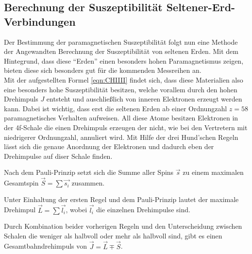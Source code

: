 \subsection{Berechnung der Suszeptibilität Seltener-Erd-Verbindungen}
\label{sadge2}
Der Bestimmung der paramagnetischen Suszeptibilität folgt nun eine Methode der Angewandten Berechnung der Suszeptibilität von 
seltenen Erden. Mit dem Hintegrund, dass diese \enquote{Erden} einen besonders hohen Paramagnetismus zeigen, bieten diese sich besonders
gut für die kommenden Messreihen an. 
\\
\newline
Mit der aufgestellten Formel \eqref{eqn:CHIIII} findet sich, dass diese Materialien also eine besonders hohe Suszeptibilität besitzen, welche 
vorallem durch den hohen Drehimpuls $J$ entsteht und auschließlich von inneren Elektronen erzeugt werden kann.
Dabei ist wichtig, dass erst die seltenen Erden ab einer Ordnungzahl $z=58$ paramagnetisches Verhalten aufweisen. 
All diese Atome besitzen Elektronen in der 4f-Schale die einen Drehimpuls erzeugen der nicht, wie bei den Vertretern mit niedrigerer
Ordnungzahl, annuliert wird. Mit Hilfe der drei Hund'schen Regeln lässt sich die genaue Anordnung der Elektronen und dadurch eben der Drehimpulse
auf diser Schale finden.
\begin{description}
    \item Nach dem Pauli-Prinzip setzt sich die Summe aller Spins $\vec{s}$ zu einem maximalen Gesamtspin $\vec{S}=\sum \vec{s_i}$ zusammen. \\
    \item Unter Einhaltung der ersten Regel und dem Pauli-Prinzip lautet der maximale Drehimpul $\vec{L}= \sum \vec{l_i}$, wobei $\vec{l_i}$ die einzelnen Drehimpulse sind.  \\
    \item Durch Kombination beider vorherigen Regeln und den Unterscheidung zwischen Schalen die weniger als halbvoll oder mehr als halbvoll sind,
    gibt es einen Gesamtbahndrehimpuls von $\vec{J} =\vec{L} \mp \vec{S}$.
\end{description}


